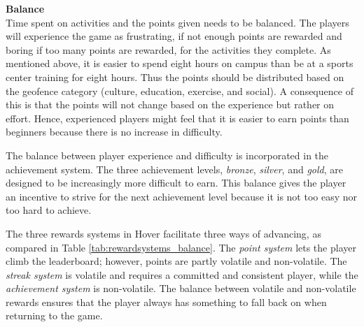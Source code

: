 \textbf{Balance} \\
Time spent on activities and the points given needs to be balanced. The players will experience the game as frustrating, if not enough points are rewarded and boring if too many points are rewarded, for the activities they complete. As mentioned above, it is easier to spend eight hours on campus than be at a sports center training for eight hours. Thus the points should be distributed based on the geofence category (culture, education, exercise, and social). A consequence of this is that the points will not change based on the experience but rather on effort. Hence, experienced players might feel that it is easier to earn points than beginners because there is no increase in difficulty.

The balance between player experience and difficulty is incorporated in the achievement system. The three achievement levels, \textit{bronze}, \textit{silver}, and \textit{gold}, are designed to be increasingly more difficult to earn. This balance gives the player an incentive to strive for the next achievement level because it is not too easy nor too hard to achieve. 

The three rewards systems in Hover facilitate three ways of advancing, as compared in Table \ref{tab:rewardsystems_balance}. The \textit{point system} lets the player climb the leaderboard; however, points are partly volatile and non-volatile. The \textit{streak system} is volatile and requires a committed and consistent player, while the \textit{achievement system} is non-volatile. The balance between volatile and non-volatile rewards ensures that the player always has something to fall back on when returning to the game.

